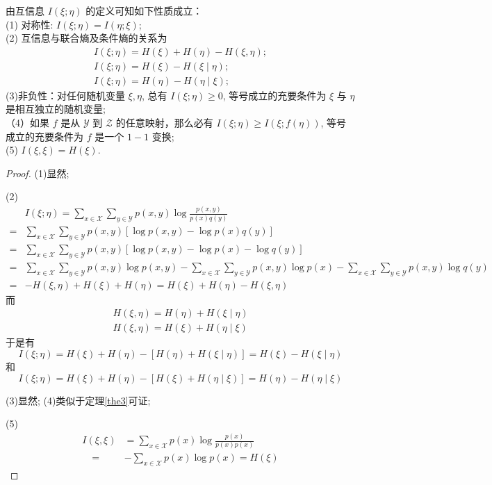 \begin{theorem}
    由互信息 $ I(\xi ; \eta) $ 的定义可知如下性质成立：\\
(1) 对称性: $ I(\xi ; \eta)=I(\eta ; \xi) $;\\
(2) 互信息与联合熵及条件熵的关系为
$$
\begin{array}{l}
I(\xi ; \eta)=H(\xi)+H(\eta)-H(\xi, \eta) ; \\
I(\xi ; \eta)=H(\xi)-H(\xi \mid \eta) ; \\
I(\xi ; \eta)=H(\eta)-H(\eta \mid \xi) ;
\end{array}
$$
(3)非负性：对任何随机变量 $ \xi, \eta $, 总有 $ I(\xi ; \eta) \geqslant 0 $, 等号成立的充要条件为 $ \xi $ 与 $ \eta $ 是相互独立的随机变量;\\
（4）如果 $ f $ 是从 $ \mathscr{Y} $ 到 $ \mathscr{Z} $ 的任意映射，那么必有 $ I(\xi ; \eta) \geqslant I(\xi ; f(\eta)) $, 等号成立的充要条件为 $ f $ 是一个 $ 1-1 $ 变换;\\
(5) $ I(\xi, \xi)=H(\xi) . $

\end{theorem}
\begin{proof}
(1)显然;

(2)
$$
 \begin{aligned}
& I(\xi ; \eta)=\sum_{x \in \mathscr{X}} \sum_{y \in \mathscr{Y}} p(x, y) \log \frac{p(x, y)}{p(x) q(y)} \\
= & \sum_{x \in \mathscr{X}} \sum_{y \in \mathscr{Y}} p(x, y)[\log p(x, y)-\log p(x) q(y)] \\
= & \sum_{x \in \mathscr{X}} \sum_{y \in \mathscr{Y}} p(x, y)[\log p(x, y)-\log p(x)-\log q(y)] \\
= & \sum_{x \in \mathscr{X}} \sum_{y \in \mathscr{Y}} p(x, y) \log p(x, y)-\sum_{x \in \mathscr{X}} \sum_{y \in \mathscr{Y}} p(x, y) \log p(x)  -\sum_{x \in \mathscr{X}} \sum_{y \in \mathscr{Y}} p(x, y) \log q(y) \\
= & -H(\xi, \eta)+H(\xi)+H(\eta)=H(\xi)+H(\eta)-H(\xi, \eta)
\end{aligned}
$$
而
$$
\begin{array}{l}
H(\xi, \eta)=H(\eta)+H(\xi \mid \eta) \\
H(\xi, \eta)=H(\xi)+H(\eta \mid \xi)
\end{array}
$$
于是有
$$
I(\xi ; \eta)  =H(\xi)+H(\eta)-[H(\eta)+H(\xi \mid \eta)]  =H(\xi)-H(\xi \mid \eta)
$$
和 $$ I(\xi ; \eta)=H(\xi)+H(\eta)-[H(\xi)+H(\eta \mid \xi)]
=H(\eta)-H(\eta \mid \xi)
$$

(3)显然;
(4)类似于定理\ref{the3}可证;

(5)
$$
\begin{aligned}
I(\xi, \xi) & =\sum_{x \in \mathscr{X}} p(x) \log \frac{p(x)}{p(x) p(x)} \\
\quad= & -\sum_{x \in \mathscr{X}} p(x) \log p(x)=H(\xi)
\end{aligned}
$$
\end{proof}

